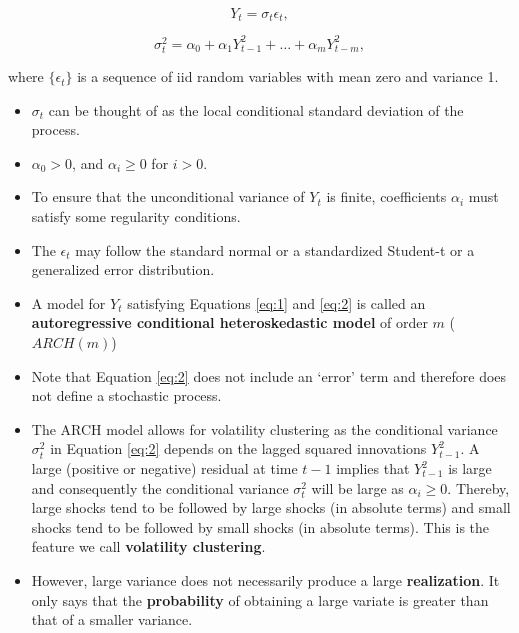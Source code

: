 \documentclass[]{book}
\providecommand{\tightlist}{%
  \setlength{\itemsep}{0pt}\setlength{\parskip}{0pt}}
\begin{document}
\begin{equation} \label{eq:1}
Y_t=\sigma_t\epsilon_t,
\end{equation}

\begin{equation} \label{eq:2}
\sigma_t^2 =\alpha_0+\alpha_1Y_{t-1}^2+\dots+\alpha_mY_{t-m}^2,
\end{equation}

where \(\{\epsilon_t\}\) is a sequence of iid random variables with mean zero and variance 1.

\begin{itemize}
\tightlist
\item
  \(\sigma_t\) can be thought of as the local conditional standard deviation of the process.
\item
  \(\alpha_0>0\), and \(\alpha_i\geq0\) for \(i > 0\).
\item
  To ensure that the unconditional variance of \(Y_t\) is finite, coefficients \(\alpha_i\) must satisfy some regularity conditions.
\item
  The \(\epsilon_t\) may follow the standard normal or a standardized Student-t or a generalized error distribution.
\end{itemize}

\begin{itemize}
\item
  A model for \(Y_t\) satisfying Equations \ref{eq:1} and \ref{eq:2} is called an \textbf{autoregressive conditional heteroskedastic model} of order \(m\) (\(ARCH(m)\))
\item
  Note that Equation \ref{eq:2} does not include an `error' term and therefore does not define a stochastic process.
\item
  The ARCH model allows for volatility clustering as the conditional variance \(\sigma_t^2\) in Equation \ref{eq:2} depends on the lagged squared innovations \(Y^2_{t−1}\). A large (positive or negative) residual at time \(t − 1\) implies that \(Y^2_{t−1}\) is large and consequently the conditional variance \(\sigma_t^2\) will be large as \(\alpha_i ≥ 0\). Thereby, large shocks tend to be followed by large shocks (in absolute terms) and small shocks tend to be followed by small shocks (in absolute terms). This is the feature we call \textbf{volatility clustering}.
\item
  However, large variance does not necessarily produce a large \textbf{realization}. It only says that the \textbf{probability} of obtaining a large variate is greater than that of a smaller variance.
\end{itemize}
\end{document}
